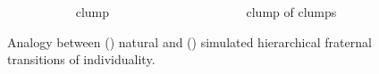 \begin{figure}
\begin{columns}
\begin{column}{0.07\textwidth}
\end{column}
\begin{column}{0.27\textwidth}
\centering
clump
\end{column}
\begin{column}{0.07\textwidth}
\end{column}
\begin{column}{0.27\textwidth}
\centering
{}clump of clumps
\end{column}
\end{columns}
\vspace{2ex}
\caption{Analogy between () natural and () simulated hierarchical fraternal transitions of individuality.}

\end{figure}

